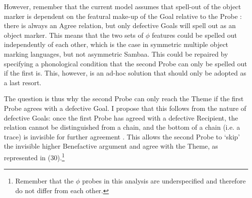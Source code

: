 \documentclass[output=paper
,modfonts
,nonflat]{langsci/langscibook}
\begin{document}
\begin{figure}[!h]
\begin{exe}
\end{exe} 
\end{figure}
\pagebreak \noindent
However, remember that the current model assumes that spell-out of the object marker is dependent on the featural make-up of the Goal relative to the Probe \citep{Roberts2010, Iorio2014, Van_der_Wal2015}: there is always an Agree relation, but only defective Goals will spell out as an object marker. This means that the two sets of $\phi$ features could be spelled out independently of each other, which is the case in symmetric multiple object marking languages, but not asymmetric Sambaa. This could be repaired by specifying a phonological condition that the second Probe can only be spelled out if the first is. This, however, is an ad-hoc solution that should only be adopted as a last resort. 

The question is thus why the second Probe can only reach the Theme if the first Probe agrees with a defective Goal. I propose that this follows from the nature of defective Goals: once the first Probe has agreed with a defective Recipient, the relation cannot be distinguished from a chain, and the bottom of a chain (i.e. a trace) is invisible for further agreement \citep{Chomsky2000, Chomsky2001}. This allows the second Probe to ‘skip’ the invisible higher Benefactive argument and agree with the Theme, as represented in (30).\footnote{Remember that the $\phi$ probes in this analysis are underspecified and therefore do not differ from each other.} 
\end{document}

